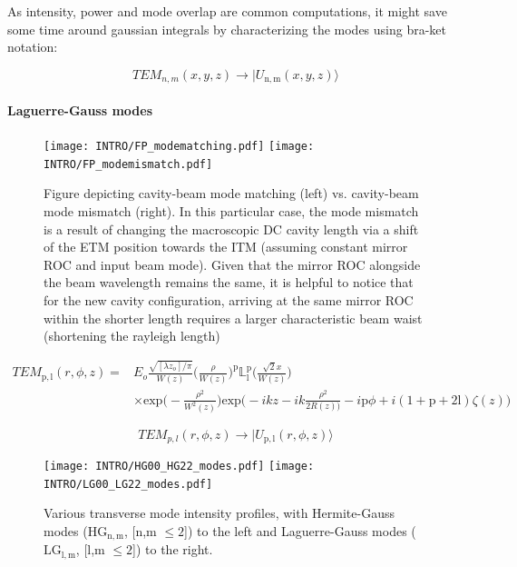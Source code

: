 As intensity, power and mode overlap are common computations, it might save some time around gaussian integrals by characterizing the modes using bra-ket notation:

$$TEM_{n,m}(x,y,z) \rightarrow | U_\mathrm{n,m}(x,y,z)\rangle$$

\paragraph*{Laguerre-Gauss modes}
\begin{figure}[H]
\begin{subcaptiongroup}
	\texttt{[image: INTRO/FP\_modematching.pdf]}
	\hspace{3.5mm}
	\texttt{[image: INTRO/FP\_modemismatch.pdf]}
\end{subcaptiongroup}
\hfill
\caption{Figure depicting cavity-beam mode matching (left) vs. cavity-beam mode mismatch (right). In this particular case, the mode mismatch is a result of changing the macroscopic DC cavity length via a shift of the ETM position towards the ITM (assuming constant mirror ROC and input beam mode). Given that the mirror ROC alongside the beam wavelength remains the same, it is helpful to notice that for the new cavity configuration, arriving at the same mirror ROC within the shorter length requires a larger characteristic beam waist (shortening the rayleigh length)}
\label{fig:fp_modemismatch}
\end{figure}

\begin{equation}\label{eq:LG_beam}
	\begin{split}
	TEM_\mathrm{p,l}(r,\phi,z) = & E_o \frac{\sqrt{[\lambda z_o] / \pi}}{W(z)} \bigg(\frac{\rho}{W(z)}\bigg)^\mathrm{p}\mathbb{L}^{\mathrm{p}}_{\mathrm{l}}\bigg(\frac{\sqrt{2}x}{W(z)}\bigg)\\
				   &  \times \mathrm{exp}\bigg(-\frac{\rho^2}{W^2(z)}\bigg) \mathrm{exp}\bigg(-ikz - ik\frac{\rho^2}{2R(z))} - i\mathrm{p}\phi + i (1+\mathrm{p}+2\mathrm{l})\zeta(z)\bigg)
	\end{split}
\end{equation}

$$TEM_{p,l}(r,\phi,z) \rightarrow | U_\mathrm{p,l}(r,\phi,z)\rangle$$


\begin{figure}[h!]
  \begin{subcaptiongroup}
	  \texttt{[image: INTRO/HG00\_HG22\_modes.pdf]}
	  \hspace{3.5mm}
	  \texttt{[image: INTRO/LG00\_LG22\_modes.pdf]}
  \end{subcaptiongroup}
  \hfill
  \caption{Various transverse mode intensity profiles, with Hermite-Gauss modes ($\mathrm{HG}_\mathrm{n,m}$, [n,m \hspace{.01pt} $\leq 2$]) to the left and Laguerre-Gauss modes ($\mathrm{LG}_\mathrm{l,m}$,  [l,m \hspace{.01pt} $\leq 2$]) to the right.}
  \label{fig:HGLG_modes}
\end{figure}


